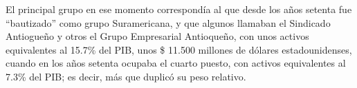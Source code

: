 \documentclass{article}
\begin{document}
	El principal grupo en ese momento correspondía al que desde los años setenta fue ``bautizado'' como grupo Suramericana, y que algunos llamaban el Sindicado Antiogueño y otros el Grupo Empresarial Antioqueño, con unos activos equivalentes al 15.7\% del PIB, unos \$ 11.500 millones de dólares estadounidenses, cuando en los años setenta ocupaba el cuarto puesto, con activos equivalentes al 7.3\% del PIB; es decir, más que duplicó su peso relativo.
\end{document}

